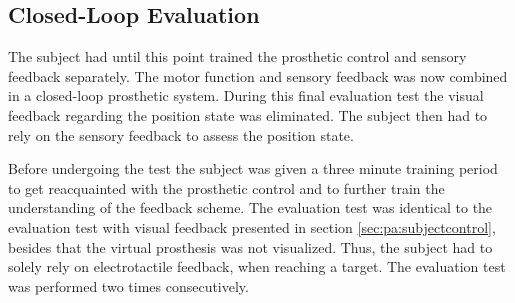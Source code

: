 

\subsection{Closed-Loop Evaluation}

The subject had until this point trained the prosthetic control and sensory feedback separately. The motor function and sensory feedback was now combined in a closed-loop prosthetic system. During this final evaluation test the visual feedback regarding the position state was eliminated. The subject then had to rely on the sensory feedback to assess the position state. 

Before undergoing the test the subject was given a three minute training period to get reacquainted with the prosthetic control and to further train the understanding of the feedback scheme. 
The evaluation test was identical to the evaluation test with visual feedback presented in section \ref{sec:pa:subjectcontrol}, besides that the virtual prosthesis was not visualized. Thus, the subject had to solely rely on electrotactile feedback, when reaching a target. The evaluation test was performed two times consecutively.
